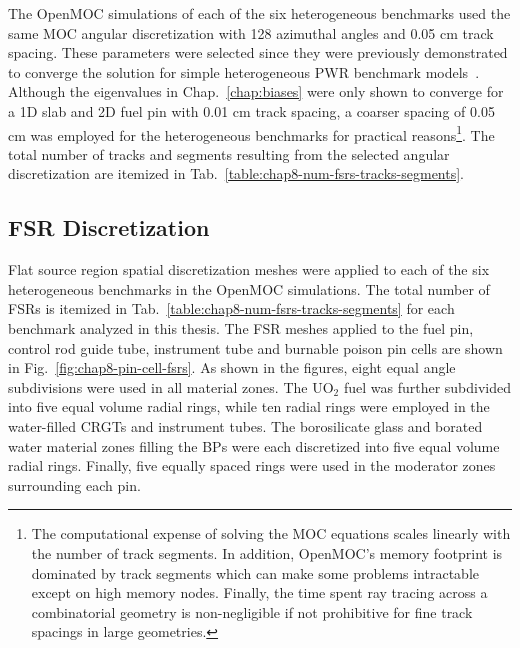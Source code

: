 The OpenMOC simulations of each of the six heterogeneous benchmarks used the same \ac{MOC} angular discretization with 128 azimuthal angles and 0.05 cm track spacing. These parameters were selected since they were previously demonstrated to converge the solution for simple heterogeneous \ac{PWR} benchmark models~\cite{boyd2014ms}. Although the eigenvalues in Chap.~\ref{chap:biases} were only shown to converge for a 1D slab and 2D fuel pin with 0.01 cm track spacing, a coarser spacing of 0.05 cm was employed for the heterogeneous benchmarks for practical reasons\footnote{The computational expense of solving the \ac{MOC} equations scales linearly with the number of track segments. In addition, OpenMOC's memory footprint is dominated by track segments which can make some problems intractable except on high memory nodes. Finally, the time spent ray tracing across a combinatorial geometry is non-negligible if not prohibitive for fine track spacings in large geometries.}. The total number of tracks and segments resulting from the selected angular discretization are itemized in Tab.~\ref{table:chap8-num-fsrs-tracks-segments}. 

\subsection{\ac{FSR} Discretization}
\label{subsec:chap8-fsr-discretizations}

Flat source region spatial discretization meshes were applied to each of the six heterogeneous benchmarks in the OpenMOC simulations. The total number of \ac{FSR}s is itemized in Tab.~\ref{table:chap8-num-fsrs-tracks-segments} for each benchmark analyzed in this thesis. The \ac{FSR} meshes applied to the fuel pin, control rod guide tube, instrument tube and burnable poison pin cells are shown in Fig.~\ref{fig:chap8-pin-cell-fsrs}. As shown in the figures, eight equal angle subdivisions were used in all material zones. The UO$_2$ fuel was further subdivided into five equal volume radial rings, while ten radial rings were employed in the water-filled \acp{CRGT} and instrument tubes. The borosilicate glass and borated water material zones filling the \acp{BP} were each discretized into five equal volume radial rings. Finally, five equally spaced rings were used in the moderator zones surrounding each pin.

